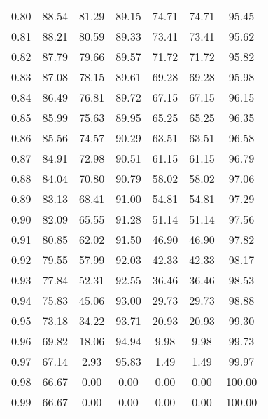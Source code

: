\begin{tabular}{|c|c|c|c|c|c|c|}
      0.80 &     88.54 &     81.29 &      89.15 &   74.71 &      74.71 &         95.45 \\
      0.81 &     88.21 &     80.59 &      89.33 &   73.41 &      73.41 &         95.62 \\
      0.82 &     87.79 &     79.66 &      89.57 &   71.72 &      71.72 &         95.82 \\
      0.83 &     87.08 &     78.15 &      89.61 &   69.28 &      69.28 &         95.98 \\
      0.84 &     86.49 &     76.81 &      89.72 &   67.15 &      67.15 &         96.15 \\
      0.85 &     85.99 &     75.63 &      89.95 &   65.25 &      65.25 &         96.35 \\
      0.86 &     85.56 &     74.57 &      90.29 &   63.51 &      63.51 &         96.58 \\
      0.87 &     84.91 &     72.98 &      90.51 &   61.15 &      61.15 &         96.79 \\
      0.88 &     84.04 &     70.80 &      90.79 &   58.02 &      58.02 &         97.06 \\
      0.89 &     83.13 &     68.41 &      91.00 &   54.81 &      54.81 &         97.29 \\
      0.90 &     82.09 &     65.55 &      91.28 &   51.14 &      51.14 &         97.56 \\
      0.91 &     80.85 &     62.02 &      91.50 &   46.90 &      46.90 &         97.82 \\
      0.92 &     79.55 &     57.99 &      92.03 &   42.33 &      42.33 &         98.17 \\
      0.93 &     77.84 &     52.31 &      92.55 &   36.46 &      36.46 &         98.53 \\
      0.94 &     75.83 &     45.06 &      93.00 &   29.73 &      29.73 &         98.88 \\
      0.95 &     73.18 &     34.22 &      93.71 &   20.93 &      20.93 &         99.30 \\
      0.96 &     69.82 &     18.06 &      94.94 &    9.98 &       9.98 &         99.73 \\
      0.97 &     67.14 &      2.93 &      95.83 &    1.49 &       1.49 &         99.97 \\
      0.98 &     66.67 &      0.00 &       0.00 &    0.00 &       0.00 &        100.00 \\
      0.99 &     66.67 &      0.00 &       0.00 &    0.00 &       0.00 &        100.00 \\
\bottomrule
\end{tabular}
